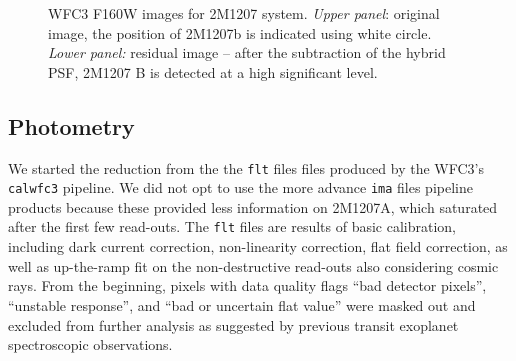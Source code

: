 \documentclass[apj]{emulateapj}
\newcommand{\ima}{\texttt{ima} files }
\newcommand{\flt}{\texttt{flt} files }
\begin{document}



\begin{figure}
  \centering
  \caption{WFC3 F160W images for 2M1207 system. {\em Upper panel}:
    original image, the position of 2M1207b is indicated using white
    circle.   {\em Lower panel:} residual image -- after the
    subtraction of the hybrid PSF, 2M1207 B is detected at a high significant level.}
  \label{fig:1}
\end{figure}

\subsection{Photometry}

We started the reduction from the the \flt files produced by the
WFC3's \texttt{calwfc3} pipeline. We did not opt to use the more
advance \ima pipeline products because these provided less information
on 2M1207A, which saturated after the first few read-outs.  The \flt
are results of basic calibration, including dark current correction,
non-linearity correction, flat field correction, as well as
up-the-ramp fit on the non-destructive read-outs also considering
cosmic rays. From the beginning, pixels with data quality flags ``bad
detector pixels'', ``unstable response'', and ``bad
or uncertain flat value'' were masked out and excluded from
further analysis as suggested by previous transit exoplanet
spectroscopic observations\citep[e.g.][]{Berta2012, Kreidberg2014}.
\end{document}

